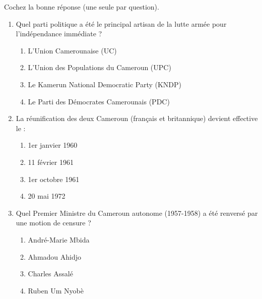 \documentclass[11pt]{article}
\begin{document}
\begin{exercice}
Cochez la bonne réponse (une seule par question).
\begin{enumerate}
    \item Quel parti politique a été le principal artisan de la lutte armée pour l'indépendance immédiate ?
    \begin{enumerate}
        \item L'Union Camerounaise (UC)
        \item L'Union des Populations du Cameroun (UPC)
        \item Le Kamerun National Democratic Party (KNDP)
        \item Le Parti des Démocrates Camerounais (PDC)
    \end{enumerate}
    \item La réunification des deux Cameroun (français et britannique) devient effective le :
    \begin{enumerate}
        \item 1er janvier 1960
        \item 11 février 1961
        \item 1er octobre 1961
        \item 20 mai 1972
    \end{enumerate}
    \item Quel Premier Ministre du Cameroun autonome (1957-1958) a été renversé par une motion de censure ?
    \begin{enumerate}
        \item André-Marie Mbida
        \item Ahmadou Ahidjo
        \item Charles Assalé
        \item Ruben Um Nyobè
    \end{enumerate}
\end{enumerate}
\end{exercice}
\end{document}
